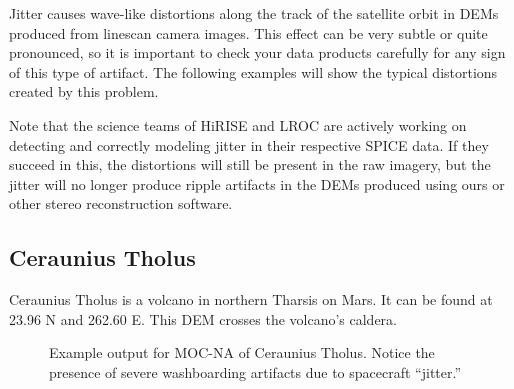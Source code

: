 Jitter causes wave-like distortions along the track of the satellite
orbit in \acp{DEM} produced from linescan camera images.  This effect can
be very subtle or quite pronounced, so it is important to check your
data products carefully for any sign of this type of artifact. The
following examples will show the typical distortions created by this
problem.

Note that the science teams of \ac{HiRISE} and \ac{LROC} are actively
working on detecting and correctly modeling jitter in their respective
SPICE data. If they succeed in this, the distortions will still
be present in the raw imagery, but the jitter will no longer produce
ripple artifacts in the DEMs produced using ours or other stereo
reconstruction software.

\subsection{Ceraunius Tholus}

Ceraunius Tholus is a volcano in northern Tharsis on Mars. It can
be found at 23.96 N and 262.60 E. This \ac{DEM} crosses the volcano's
caldera.

\begin{figure}[h!]
\centering
  \hfil
\caption{Example output for MOC-NA of Ceraunius Tholus. Notice the presence of severe washboarding artifacts due to spacecraft ``jitter.''}
\label{fig:mocna_ceraunius_example}
\end{figure}

